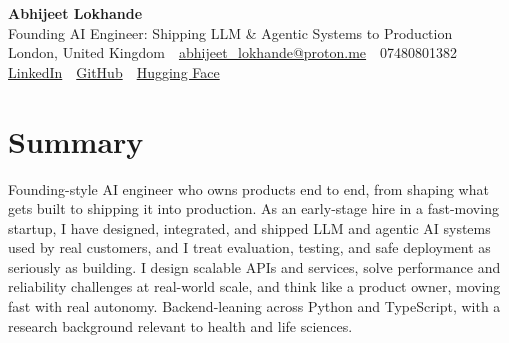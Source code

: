 \documentclass[10pt,a4paper]{article}
\newcommand{\sep}{\,\textcolor{accent!60}{\textbar}\,}
\begin{document}
\begin{center}
  {\fontsize{24}{26}\selectfont\bfseries Abhijeet Lokhande}\\[3pt]
  {\color{accent}\large Founding AI Engineer: Shipping LLM \& Agentic Systems to Production}\\[5pt]
  {\small
    London, United Kingdom \sep
    \href{mailto:abhijeet_lokhande@proton.me}{abhijeet\_lokhande@proton.me} \sep
    07480801382 \\[2pt]
    \href{https://www.linkedin.com/in/ablds/}{LinkedIn} \sep
    \href{https://github.com/abhijeetscode}{GitHub} \sep
    \href{https://huggingface.co/ab-ai}{Hugging Face}
  }
\end{center}
\vspace{2pt}

\section{Summary}
Founding-style AI engineer who owns products end to end, from shaping what gets built to shipping it into production. As an early-stage hire in a fast-moving startup, I have designed, integrated, and shipped LLM and agentic AI systems used by real customers, and I treat evaluation, testing, and safe deployment as seriously as building. I design scalable APIs and services, solve performance and reliability challenges at real-world scale, and think like a product owner, moving fast with real autonomy. Backend-leaning across Python and TypeScript, with a research background relevant to health and life sciences.

\end{document}
